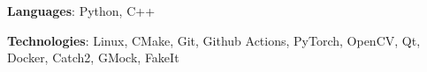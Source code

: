 
\begin{cvparagraph}

\textbf{Languages}: Python, C++

\textbf{Technologies}: Linux, CMake, Git, Github Actions, PyTorch, OpenCV, Qt, Docker, Catch2, GMock, FakeIt


\end{cvparagraph}
